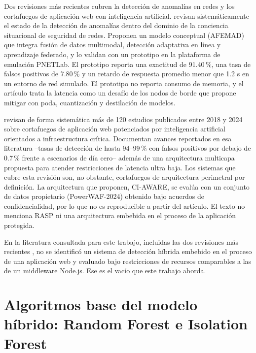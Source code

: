 Dos revisiones más recientes cubren la detección de anomalías en redes y los cortafuegos de aplicación web con inteligencia artificial. \textcite{zhen2025} revisan sistemáticamente el estado de la detección de anomalías dentro del dominio de la conciencia situacional de seguridad de redes. Proponen un modelo conceptual (AFEMAD) que integra fusión de datos multimodal, detección adaptativa en línea y aprendizaje federado, y lo validan con un prototipo en la plataforma de emulación PNETLab. El prototipo reporta una exactitud de 91.40\,\%, una tasa de falsos positivos de 7.80\,\% y un retardo de respuesta promedio menor que 1.2 s en un entorno de red simulado. El prototipo no reporta consumo de memoria, y el artículo trata la latencia como un desafío de los nodos de borde que propone mitigar con poda, cuantización y destilación de modelos.

\textcite{rahman2026} revisan de forma sistemática más de 120 estudios publicados entre 2018 y 2024 sobre cortafuegos de aplicación web potenciados por inteligencia artificial orientados a infraestructura crítica. Documentan avances reportados en esa literatura --tasas de detección de hasta 94--99\,\% con falsos positivos por debajo de 0.7\,\% frente a escenarios de día cero-- además de una arquitectura multicapa propuesta para atender restricciones de latencia ultra baja. Los sistemas que cubre esta revisión son, no obstante, cortafuegos de arquitectura perimetral por definición. La arquitectura que proponen, CI-AWARE, se evalúa con un conjunto de datos propietario (PowerWAF-2024) obtenido bajo acuerdos de confidencialidad, por lo que no es reproducible a partir del artículo. El texto no menciona RASP ni una arquitectura embebida en el proceso de la aplicación protegida.

En la literatura consultada para este trabajo, incluidas las dos revisiones más recientes \cite{zhen2025,rahman2026}, no se identificó un sistema de detección híbrida embebido en el proceso de una aplicación web y evaluado bajo restricciones de recursos comparables a las de un middleware Node.js. Ese es el vacío que este trabajo aborda.

\section{Algoritmos base del modelo híbrido: Random Forest e Isolation Forest}


